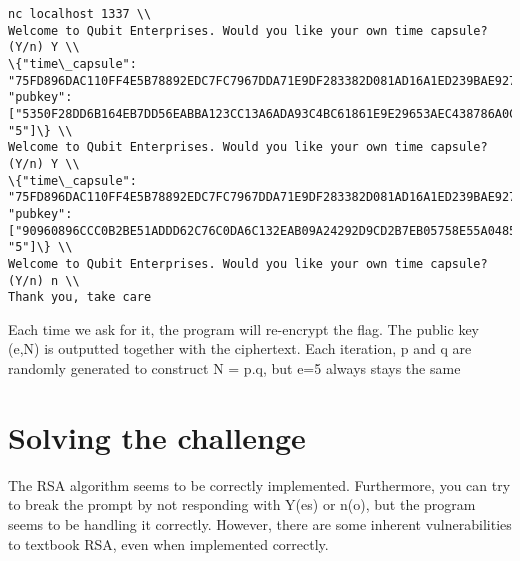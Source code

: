 \documentclass{article}
\begin{document}
\vspace{3mm}

\begin{lstlisting}
nc localhost 1337 \\
Welcome to Qubit Enterprises. Would you like your own time capsule? (Y/n) Y \\
\{"time\_capsule": "75FD896DAC110FF4E5B78892EDC7FC7967DDA71E9DF283382D081AD16A1ED239BAE927E693A52D0BF835266942D8749B583E45AFA8300B74658EF6609ED9895642D1D6365917CDAABE539DDF564D5CBADBC17A8D", "pubkey": ["5350F28DD6B164EB7DD56EABBA123CC13A6ADA93C4BC61861E9E29653AEC438786A0C8624790194DB649FB910F69C9C193526B0D24ADB27350CD75101505E0C0B897E958CA09021F5713A0EC3BF6E591202AE75A5052FA658EB658AB2FBB7EEC928763BC593276388D5082066A4D60207268E2AA00D9470CC15F81A11D103031", "5"]\} \\
Welcome to Qubit Enterprises. Would you like your own time capsule? (Y/n) Y \\
\{"time\_capsule": "75FD896DAC110FF4E5B78892EDC7FC7967DDA71E9DF283382D081AD16A1ED239BAE927E693A52D0BF835266942D8749B583E45AFA8300B74658EF6609ED9895642D1D6365917CDAABE539DDF564D5CBADBC17A8D", "pubkey": ["90960896CCC0B2BE51ADDD62C76C0DA6C132EAB09A24292D9CD2B7EB05758E55A0485C25805341B3DCA009C7EE7A28619BA4AA47CF73D25CA011B0F1573693EE11446B1EF3122AEC8EB1C1C80A54EA0FA60E03BDD26281A45CB63135B4EC55E0F425F5A4D62E2C1FA208D5E6446436DCF5DDADA79A590983289BC75BF065EE67", "5"]\} \\                                              
Welcome to Qubit Enterprises. Would you like your own time capsule? (Y/n) n \\
Thank you, take care
\end{lstlisting}

\vspace{3mm}

Each time we ask for it, the program will re-encrypt the flag. The public key (e,N) is outputted together with the ciphertext. Each iteration, p and q are randomly generated to construct N = p.q, but e=5 always stays the same

\section{Solving the challenge}
The RSA algorithm seems to be correctly implemented. Furthermore, you can try to break the prompt by not responding with Y(es) or n(o), but the program seems to be handling it correctly. However, there are some inherent vulnerabilities to textbook RSA, even when implemented correctly. 
\end{document}
